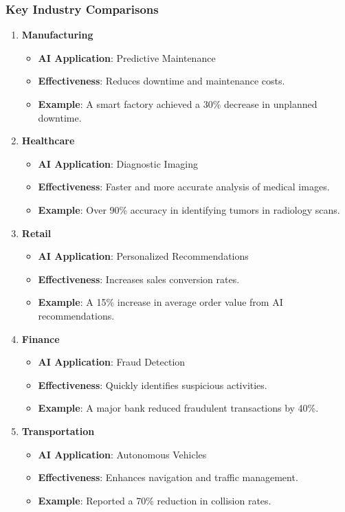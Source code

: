 \documentclass{beamer}
\begin{document}
\begin{frame}[fragile]
    \frametitle{Key Industry Comparisons}
    \begin{enumerate}
        \item \textbf{Manufacturing}
            \begin{itemize}
                \item \textbf{AI Application}: Predictive Maintenance
                \item \textbf{Effectiveness}: Reduces downtime and maintenance costs.
                \item \textbf{Example}: A smart factory achieved a 30\% decrease in unplanned downtime.
            \end{itemize}

        \item \textbf{Healthcare}
            \begin{itemize}
                \item \textbf{AI Application}: Diagnostic Imaging
                \item \textbf{Effectiveness}: Faster and more accurate analysis of medical images.
                \item \textbf{Example}: Over 90\% accuracy in identifying tumors in radiology scans.
            \end{itemize}

        \item \textbf{Retail}
            \begin{itemize}
                \item \textbf{AI Application}: Personalized Recommendations
                \item \textbf{Effectiveness}: Increases sales conversion rates.
                \item \textbf{Example}: A 15\% increase in average order value from AI recommendations.
            \end{itemize}

        \item \textbf{Finance}
            \begin{itemize}
                \item \textbf{AI Application}: Fraud Detection
                \item \textbf{Effectiveness}: Quickly identifies suspicious activities.
                \item \textbf{Example}: A major bank reduced fraudulent transactions by 40\%.
            \end{itemize}

        \item \textbf{Transportation}
            \begin{itemize}
                \item \textbf{AI Application}: Autonomous Vehicles
                \item \textbf{Effectiveness}: Enhances navigation and traffic management.
                \item \textbf{Example}: Reported a 70\% reduction in collision rates.
            \end{itemize}
    \end{enumerate}
\end{frame}
\end{document}
